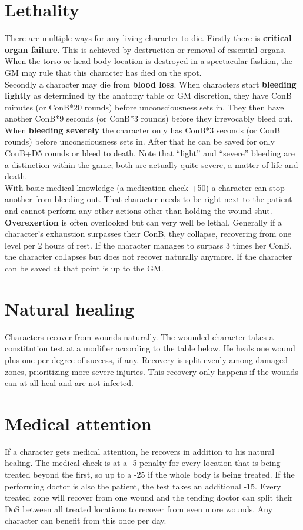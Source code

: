 \documentclass[12pt,a4paper,openany]{book}
\begin{document}
	\section{Lethality}
	There are multiple ways for any living character to die. 
	Firstly there is \textbf{critical organ failure}. This is achieved by destruction or removal of essential organs. When the torso or head body location is destroyed in a spectacular fashion, the GM may rule that this character has died on the spot.\\
	Secondly a character may die from \textbf{blood loss}. When characters start \textbf{bleeding lightly} as determined by the anatomy table or GM discretion, they have ConB minutes (or ConB*20 rounds) before unconsciousness sets in. They then have another ConB*9 seconds (or ConB*3 rounds) before they irrevocably bleed out. When \textbf{bleeding severely} the character only has ConB*3 seconds (or ConB rounds) before unconsciousness sets in. After that he can be saved for only ConB+D5 rounds or bleed to death. Note that “light” and “severe” bleeding are a distinction within the game; both are actually quite severe, a matter of life and death.\\
	With basic medical knowledge (a medication check +50) a character can stop another from bleeding out. That character needs to be right next to the patient and cannot perform any other actions other than holding the wound shut.\\
	\textbf{Overexertion} is often overlooked but can very well be lethal. Generally if a character’s exhaustion surpasses their ConB, they collapse, recovering from one level per 2 hours of rest. If the character manages to surpass 3 times her ConB, the character collapses but does not recover naturally anymore. If the character can be saved at that point is up to the GM.
	\section{Natural healing}
	Characters recover from wounds naturally. The wounded character takes a constitution test at a modifier according to the table below. He heals one wound plus one per degree of success, if any. Recovery is split evenly among damaged zones, prioritizing more severe injuries. This recovery only happens if the wounds can at all heal and are not infected.
	\section{Medical attention}
	If a character gets medical attention, he recovers in addition to his natural healing. The medical check is at a -5 penalty for every location that is being treated beyond the first, so up to a -25 if the whole body is being treated. If the performing doctor is also the patient, the test takes an additional -15. Every treated zone will recover from one wound and the tending doctor can split their DoS between all treated locations to recover from even more wounds. Any character can benefit from this once per day.
\end{document}

